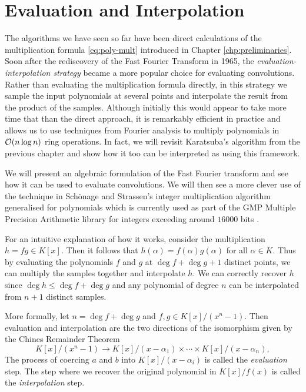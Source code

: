 \chapter{Evaluation and Interpolation}\label{chp:eval-interp}

The algorithms we have seen so far have been direct calculations of the multiplication formula \eqref{eq:poly-mult} introduced in Chapter \ref{chp:preliminaries}. Soon after the rediscovery of the Fast Fourier Transform in 1965, the \textit{evaluation-interpolation strategy} became a more popular choice for evaluating convolutions. Rather than evaluating the multiplication formula directly, in this strategy we sample the input polynomials at several points and interpolate the result from the product of the samples. Although initially this would appear to take more time that than the direct approach, it is remarkably efficient in practice and allows us to use techniques from Fourier analysis to multiply polynomials in $\mathcal O(n \log n)$ ring operations. In fact, we will revisit Karatsuba's algorithm from the previous chapter and show how it too can be interpreted as using this framework.

We will present an algebraic formulation of the Fast Fourier transform and see how it can be used to evaluate convolutions. We will then see a more clever use of the technique in Sch\"{o}nage and Strassen's integer multiplication algorithm generalised for polynomials which is currently used as part of the GMP Multiple Precision Arithmetic library for integers exceeding around $16000$ bits \cite{gmp-big-num}.

For an intuitive explanation of how it works, consider the multiplication $h = fg \in K[x]$. Then it follows that $h(\alpha) = f(\alpha)g(\alpha)$ for all $\alpha \in K$. Thus by evaluating the polynomials $f$ and $g$ at $\deg f + \deg g + 1$ distinct points, we can multiply the samples together and interpolate $h$. We can correctly recover $h$ since $\deg h \le \deg f + \deg g$ and any polynomial of degree $n$ can be interpolated from $n + 1$ distinct samples.

More formally, let $n = \deg f + \deg g$ and $f, g \in K[x]/(x^n - 1)$. Then evaluation and interpolation are the two directions of the isomorphism given by the Chines Remainder Theorem
\[
    K[x]/(x^n - 1) \to K[x]/(x - \alpha_1) \times \cdots \times K[x]/(x - \alpha_n),
\]
The process of coercing $a$ and $b$ into $K[x]/ (x - \alpha_i)$ is called the \emph{evaluation} step. The step where we recover the original polynomial in $K[x]/f(x)$ is called the \emph{interpolation} step.

